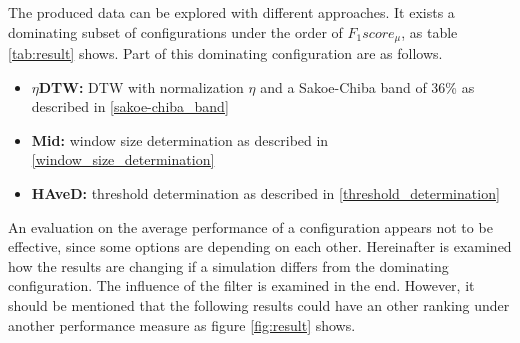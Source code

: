 The produced data can be explored with different approaches. It exists a dominating subset of configurations under the
order of $F_{1}score_{\mu}$, as table \ref{tab:result} shows. Part of this dominating configuration are as follows.
\begin{itemize}
    \item \textbf{$\eta$DTW:} DTW with normalization $\eta$ and a Sakoe-Chiba band of 36\% as described in
    \ref{sakoe-chiba_band}
    \item \textbf{Mid:} window size determination as described in \ref{window_size_determination}
    \item \textbf{HAveD:} threshold determination as described in \ref{threshold_determination}
\end{itemize}
An evaluation on the average performance of a configuration appears not to be effective, since some options are depending on
each other. Hereinafter is examined how the results are changing if a simulation differs from the dominating
configuration. The influence of the filter is examined in the end. However, it should be mentioned that the
following results could have an other ranking under another performance measure as figure \ref{fig:result} shows.

